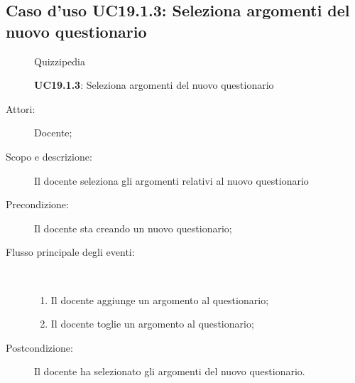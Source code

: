 \subsection{Caso d'uso UC19.1.3: Seleziona argomenti del nuovo questionario}
	\begin{figure}[H]
		\centering
		\begin{resizedtikzpicture}{\textwidth}
		\begin{umlsystem}[x=0, fill=lightgray!20]{Quizzipedia}
		\end{umlsystem}
		\end{resizedtikzpicture}
		\caption{\textbf{UC19.1.3}: Seleziona argomenti del nuovo questionario}
		\label{UC19.1.3}
	\end{figure}
\begin{description}
\item[Attori:] Docente;
\item[Scopo e descrizione:] Il docente seleziona gli argomenti relativi al nuovo questionario 
      \item[Precondizione:] Il docente sta creando un nuovo questionario;

        \item[Flusso principale degli eventi:] \ 
 \begin{enumerate}
          \item Il docente aggiunge un argomento al questionario;
          \item Il docente toglie un argomento al questionario;

      \end{enumerate}
    \item[Postcondizione:] Il docente ha selezionato gli argomenti del nuovo questionario.
  \end{description}
\hypertarget{UC19.2}{}
